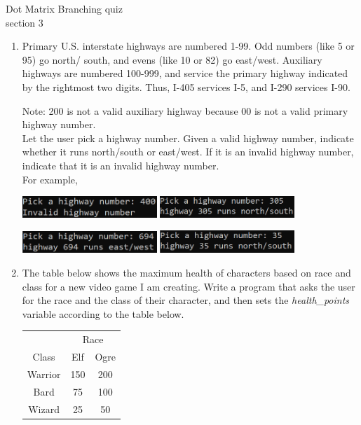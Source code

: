 \documentclass{article}
\begin{document}
\pagebreak
Dot Matrix \hfill Branching quiz\\
section 3\\
\begin{enumerate}
	\item 
		Primary U.S. interstate highways are numbered 1-99.  Odd numbers (like 5 or 95) go north/
		south, and evens (like 10 or 82) go east/west.  Auxiliary highways are numbered 100-999, and 
		service the primary highway indicated by the rightmost two digits.  Thus, I-405 services 
		I-5, and I-290 services I-90.
		
		Note: 200 is not a valid auxiliary highway because 00 is not a valid primary highway 
		number.\\
		
		Let the user pick a highway number.  Given a valid highway number, indicate whether it runs 
		north/south or east/west.  If it is an invalid highway number, indicate that it is an 
		invalid highway number. \\
		For example,
		
		\hfill
		\includegraphics[width = 2in]{./imgs/highwayValidator1.PNG} \hfill
		\includegraphics[width = 2in]{./imgs/highwayValidator2.PNG} \hfill \ 

		\hfill 
		\includegraphics[width = 2in]{./imgs/highwayValidator3.PNG} \hfill 
		\includegraphics[width = 2in]{./imgs/highwayValidator4.PNG} \hfill \ 


	\item		
		The table below shows the maximum health of characters based on race and class for a new video game 
		I am creating.  Write a program that asks the user for the race and the class of their character, 
		and then sets the \textit{health\_points}	variable according to the table below.
		\begin{flushright}
		\begin{tabular}{c|cc}
			& \multicolumn{2}{c}{Race}\\
			Class & Elf & Ogre \\ \hline
			Warrior & 150 & 200\\
			Bard & 75 & 100\\
			Wizard & 25 & 50 \\
		\end{tabular}
		\end{flushright}
		

\end{enumerate}
\end{document}
